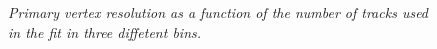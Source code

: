 \begin{figure}[!h]
\begin{center}
\centerline{
}
\caption{\sl
Primary vertex resolution as a function of the number of tracks used in the fit in three diffetent \ptm bins. 
}
\label{fig:mcVsmcsplit}
\end{center}
\end{figure}  
